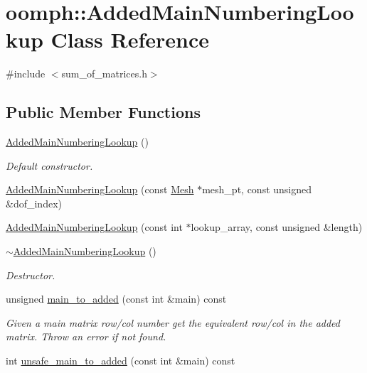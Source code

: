 \hypertarget{classoomph_1_1AddedMainNumberingLookup}{}\section{oomph\+:\+:Added\+Main\+Numbering\+Lookup Class Reference}
\label{classoomph_1_1AddedMainNumberingLookup}


{\ttfamily \#include $<$sum\+\_\+of\+\_\+matrices.\+h$>$}

\subsection*{Public Member Functions}
\begin{DoxyCompactItemize}
\item 
\hyperlink{classoomph_1_1AddedMainNumberingLookup_a46fceb572186ca8f41f158c9fddfc623}{Added\+Main\+Numbering\+Lookup} ()
\begin{DoxyCompactList}\small\item\em Default constructor. \end{DoxyCompactList}\item 
\hyperlink{classoomph_1_1AddedMainNumberingLookup_a2697ff1ddcd2f6b0b7f22fb7cd56651b}{Added\+Main\+Numbering\+Lookup} (const \hyperlink{classoomph_1_1Mesh}{Mesh} $\ast$mesh\+\_\+pt, const unsigned \&dof\+\_\+index)
\item 
\hyperlink{classoomph_1_1AddedMainNumberingLookup_a643646f38ca0d58f7e1ed32c06a18aa8}{Added\+Main\+Numbering\+Lookup} (const int $\ast$lookup\+\_\+array, const unsigned \&length)
\item 
\hyperlink{classoomph_1_1AddedMainNumberingLookup_ae2748af464febc0fb1150e8cc7ab0d73}{$\sim$\+Added\+Main\+Numbering\+Lookup} ()
\begin{DoxyCompactList}\small\item\em Destructor. \end{DoxyCompactList}\item 
unsigned \hyperlink{classoomph_1_1AddedMainNumberingLookup_a3602f98bdd41d51ac36efeafdb58ceb0}{main\+\_\+to\+\_\+added} (const int \&main) const
\begin{DoxyCompactList}\small\item\em Given a main matrix row/col number get the equivalent row/col in the added matrix. Throw an error if not found. \end{DoxyCompactList}\item 
int \hyperlink{classoomph_1_1AddedMainNumberingLookup_a880b713fdcd217099c6f8bbedd133d15}{unsafe\+\_\+main\+\_\+to\+\_\+added} (const int \&main) const

\end{DoxyCompactItemize}
